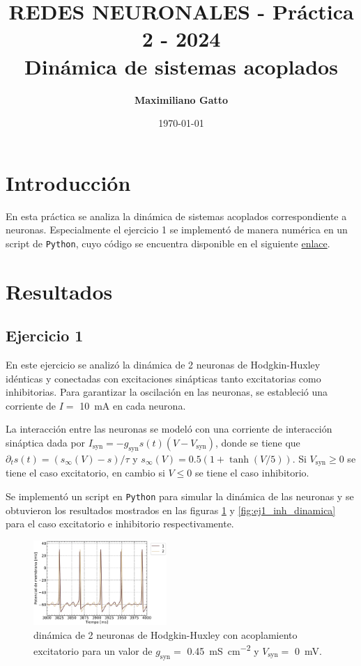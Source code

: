 \documentclass[11pt, twocolumn]{article}
\title{{\large REDES NEURONALES - Práctica 2 - 2024} \\ \vspace{1cm}\textbf{Dinámica de sistemas acoplados}}
\author[ ]{\textbf{Maximiliano Gatto}}
\affil[ ]{Instituto Balseiro (UNCuyo - CNEA) - Bariloche, Río Negro, Argentina\vspace{0.4cm}}
\affil[ ]{\href{mailto:maximiliano.gatto@ib.edu.ar}{maximiliano.gatto@ib.edu.ar}}
\date{\today}
\begin{document}
\maketitle

\section{Introducción}
En esta práctica se analiza la dinámica de sistemas acoplados correspondiente a neuronas. Especialmente el ejercicio 1 se implementó de manera numérica en un script de \texttt{Python}, cuyo código se encuentra disponible en el siguiente \href{}{enlace}.


\section{Resultados}

\subsection*{Ejercicio 1}
En este ejercicio se analizó la dinámica de 2 neuronas de Hodgkin-Huxley idénticas y conectadas con excitaciones sinápticas tanto excitatorias como inhibitorias. Para garantizar la oscilación en las neuronas, se estableció una corriente de $I = $ \SI{10}{\milli\ampere} en cada neurona.

La interacción entre las neuronas se modeló con una corriente de interacción sináptica dada por \(I_\text{syn} = -g_\text{syn} s(t)(V-V_\text{syn})\), donde se tiene que \(\partial _t s(t) = (s_\infty(V) - s) / \tau\) y \(s_\infty(V) = 0.5(1+\tanh (V/5))\). Si \(V_\text{syn} \geq 0\) se tiene el caso excitatorio, en cambio si \(V \leq 0\) se tiene el caso inhibitorio.

Se implementó un script en \texttt{Python} para simular la dinámica de las neuronas y se obtuvieron los resultados mostrados en las figuras \ref{fig:ej1_exc_dinamica} y \ref{fig:ej1_inh_dinamica} para el caso excitatorio e inhibitorio respectivamente. 

\begin{figure} [htbp]
    \centering
    \includegraphics[width=0.45\textwidth]{figuras/excitatorio.pdf}
    \caption{dinámica de 2 neuronas de Hodgkin-Huxley con acoplamiento excitatorio para un valor de \(g_\text{syn} =\) \SI{0.45}{\milli\siemens\per \centi\meter\squared} y \(V_\text{syn} =\) \SI{0}{\milli\volt}.}
    \label{fig:ej1_exc_dinamica}    
\end{figure}
\end{document}
